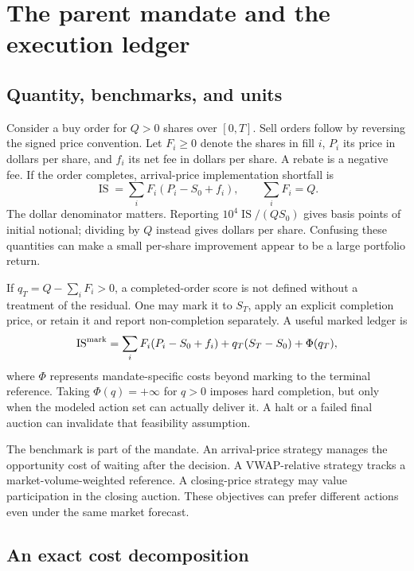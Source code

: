 \documentclass[11pt]{article}
\numberwithin{equation}{section}
\theoremstyle{definition}
\theoremstyle{remark}
\theoremstyle{definition}
\begin{document}
\section{The parent mandate and the execution ledger}\label{sec:ledger}

\subsection{Quantity, benchmarks, and units}

Consider a buy order for $Q>0$ shares over $[0,T]$. Sell orders follow by reversing
the signed price convention. Let $F_i\geq0$ denote the shares in fill $i$, $P_i$
its price in dollars per share, and $f_i$ its net fee in dollars per share.
A rebate is a negative fee. If the order completes, arrival-price implementation
shortfall is
\begin{equation}\label{eq:is}
 \operatorname{IS}=\sum_i F_i(P_i-S_0+f_i),\qquad \sum_iF_i=Q.
\end{equation}
The dollar denominator matters. Reporting $10^4\operatorname{IS}/(QS_0)$ gives
basis points of initial notional; dividing by $Q$ instead gives dollars per share.
Confusing these quantities can make a small per-share improvement appear to be
a large portfolio return.

If $q_T=Q-\sum_iF_i>0$, a completed-order score is not defined without a treatment
of the residual. One may mark it to $S_T$, apply an explicit completion price,
or retain it and report non-completion separately. A useful marked ledger is
\begin{equation}\label{eq:residual}
 \operatorname{IS}^{\rm mark}
 =\sum_i F_i(P_i-S_0+f_i)+q_T(S_T-S_0)+\Phi(q_T),
\end{equation}
where $\Phi$ represents mandate-specific costs beyond marking to the terminal
reference. Taking $\Phi(q)=+\infty$ for $q>0$ imposes hard completion, but only
when the modeled action set can actually deliver it. A halt or a failed final
auction can invalidate that feasibility assumption.

The benchmark is part of the mandate. An arrival-price strategy manages the
opportunity cost of waiting after the decision. A VWAP-relative strategy tracks
a market-volume-weighted reference. A closing-price strategy may value
participation in the closing auction. These objectives can prefer different
actions even under the same market forecast.

\subsection{An exact cost decomposition}
\end{document}

